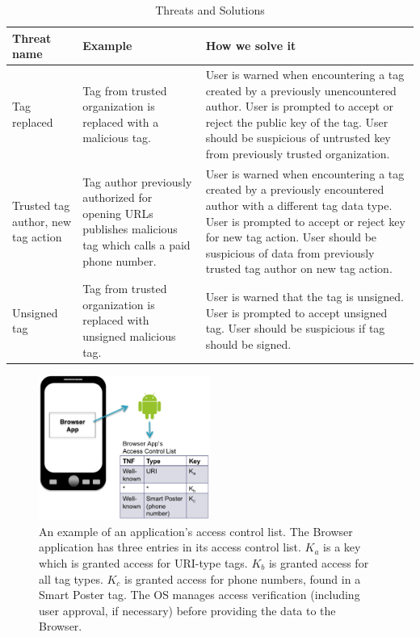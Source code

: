 \documentclass[12pt]{article}
\begin{document}
\begin{table}
  \center
  \begin{tabular}{p{3cm} | p{6cm} | p{6cm} }
  Threat name & Example & How we solve it \\
  \hline
  Tag replaced & Tag from trusted organization is replaced with a malicious tag. & User is warned when encountering a tag created by a previously unencountered author. User is prompted to accept or reject the public key of the tag. User should be suspicious of untrusted key from previously trusted organization. \\
  \hline
  Trusted tag author, new tag action & Tag author previously authorized for opening URLs publishes malicious tag which calls a paid phone number. & User is warned when encountering a tag created by a previously encountered author with a different tag data type. User is prompted to accept or reject key for new tag action. User should be suspicious of data from previously trusted tag author on new tag action. \\
  \hline
  Unsigned tag & Tag from trusted organization is replaced with unsigned malicious tag. & User is warned that the tag is unsigned. User is prompted to accept unsigned tag. User should be suspicious if tag should be signed. \\
  \end{tabular}
  \caption{Threats and Solutions}
  \label{tab:threats}
\end{table}

\begin{figure}[h!]
\begin{minipage}{\textwidth}
	\centering
		\includegraphics[width=0.5\textwidth]{ACL_image.png}
	\caption[Caption for LOF]%
    {An example of an application's access control list. The Browser application has three entries in its access control list. $K_a$ is a key which is granted access for URI-type tags. $K_b$ is granted access for all tag types. $K_c$ is granted access for phone numbers, found in a Smart Poster tag. The OS manages access verification (including user approval, if necessary) before providing the data to the Browser.}
  \label{fig:solution:acl}

\end{minipage} 
\end{figure}
\end{document}
